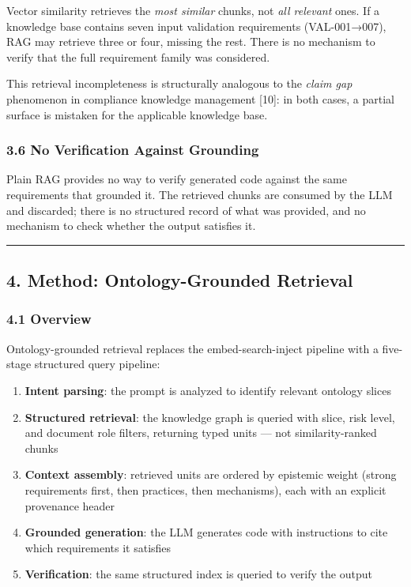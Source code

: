 \documentclass[
]{article}
\providecommand{\tightlist}{%
  \setlength{\itemsep}{0pt}\setlength{\parskip}{0pt}}
\begin{document}
Vector similarity retrieves the \emph{most similar} chunks, not
\emph{all relevant} ones. If a knowledge base contains seven input
validation requirements (VAL-001→007), RAG may retrieve three or four,
missing the rest. There is no mechanism to verify that the full
requirement family was considered.

This retrieval incompleteness is structurally analogous to the
\emph{claim gap} phenomenon in compliance knowledge management {[}10{]}:
in both cases, a partial surface is mistaken for the applicable
knowledge base.

\subsubsection{3.6 No Verification Against
Grounding}\label{no-verification-against-grounding}

Plain RAG provides no way to verify generated code against the same
requirements that grounded it. The retrieved chunks are consumed by the
LLM and discarded; there is no structured record of what was provided,
and no mechanism to check whether the output satisfies it.

\begin{center}\rule{0.5\linewidth}{0.5pt}\end{center}

\subsection{4. Method: Ontology-Grounded
Retrieval}\label{method-ontology-grounded-retrieval}

\subsubsection{4.1 Overview}\label{overview}

Ontology-grounded retrieval replaces the embed-search-inject pipeline
with a five-stage structured query pipeline:

\begin{enumerate}
\def\labelenumi{\arabic{enumi}.}
\tightlist
\item
  \textbf{Intent parsing}: the prompt is analyzed to identify relevant
  ontology slices
\item
  \textbf{Structured retrieval}: the knowledge graph is queried with
  slice, risk level, and document role filters, returning typed units
  --- not similarity-ranked chunks
\item
  \textbf{Context assembly}: retrieved units are ordered by epistemic
  weight (strong requirements first, then practices, then mechanisms),
  each with an explicit provenance header
\item
  \textbf{Grounded generation}: the LLM generates code with instructions
  to cite which requirements it satisfies
\item
  \textbf{Verification}: the same structured index is queried to verify
  the output
\end{enumerate}
\end{document}
